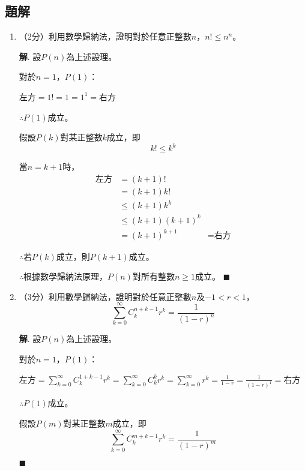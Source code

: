 \documentclass[12pt]{article}
\newenvironment*{sol}{\par \textbf{解}.}{\hfill$\blacksquare$}
\begin{document}
    \subsection*{題解}

    \begin{enumerate}
        \item （2分）利用數學歸納法，證明對於任意正整數$n$，$n!\leq n^n$。\begin{sol}
            設$P(n)$為上述設理。

                對於$n=1$，$P(1)$：

                左方$=1!=1=1^1=$右方

                $\therefore P(1)$成立。

                假設$P(k)$對某正整數$k$成立，即$$k!\leq k^k$$

                當$n=k+1$時，\begin{align*}
                    \textrm{左方}&=(k+1)!\\
                    &=(k+1)k!\\
                    &\leq (k+1)k^k\\
                    &\leq (k+1)(k+1)^k\\
                    &=(k+1)^{k+1}
                    &=\textrm{右方}
                \end{align*}

                $\therefore$若$P(k)$成立，則$P(k+1)$成立。

                $\therefore$根據數學歸納法原理，$P(n)$對所有整數$n\geq 1$成立。
        \end{sol}
        \item （3分）利用數學歸納法，證明對於任意正整數$n$及$-1<r<1$，$$\sum_{k=0}^\infty C_k^{n+k-1}r^k=\frac{1}{(1-r)^n}$$\begin{sol}
            設$P(n)$為上述設理。

                對於$n=1$，$P(1)$：

                左方$=\sum_{k=0}^\infty C_k^{1+k-1}r^k=\sum_{k=0}^{\infty}C_k^kr^k=\sum_{k=0}^{\infty}r^k=\frac{1}{1-r}=\frac{1}{(1-r)^1}=$右方

                $\therefore P(1)$成立。

                假設$P(m)$對某正整數$m$成立，即$$\sum_{k=0}^\infty C_k^{m+k-1}r^k=\frac{1}{(1-r)^m}$$


\end{sol}
\end{enumerate}
\end{document}
